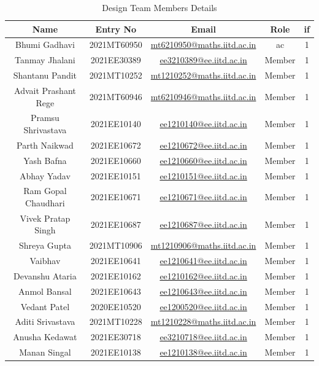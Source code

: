 \documentclass[12pt]{article} %
\begin{document}
\begin{table}[h!]
\centering
\begin{tabular}{|c|c|c|c|c|}
\hline
Name & Entry No & Email & Role & \acrshort{if} \\
\hline
Bhumi Gadhavi & 2021MT60950 & \href{mailto:mt6210950@maths.iitd.ac.in}{mt6210950@maths.iitd.ac.in} & \acrshort{ac} & 1 \\
Tanmay Jhalani & 2021EE30389 & \href{mailto:ee3210389@ee.iitd.ac.in}{ee3210389@ee.iitd.ac.in} & Member & 1 \\
Shantanu Pandit & 2021MT10252 & \href{mailto:mt1210252@maths.iitd.ac.in}{mt1210252@maths.iitd.ac.in} & Member & 1 \\
Advait Prashant Rege & 2021MT60946 & \href{mailto:mt6210946@maths.iitd.ac.in}{mt6210946@maths.iitd.ac.in} & Member & 1 \\
Pramsu Shrivastava & 2021EE10140 & \href{mailto:ee1210140@ee.iitd.ac.in}{ee1210140@ee.iitd.ac.in} & Member & 1 \\
Parth Naikwad & 2021EE10672 & \href{mailto:ee1210672@ee.iitd.ac.in}{ee1210672@ee.iitd.ac.in} & Member & 1 \\
Yash Bafna & 2021EE10660 & \href{mailto:ee1210660@ee.iitd.ac.in}{ee1210660@ee.iitd.ac.in} & Member & 1 \\
Abhay Yadav & 2021EE10151 & \href{mailto:ee1210151@ee.iitd.ac.in}{ee1210151@ee.iitd.ac.in} & Member & 1 \\
Ram Gopal Chaudhari & 2021EE10671 & \href{mailto:ee1210671@ee.iitd.ac.in}{ee1210671@ee.iitd.ac.in} & Member & 1 \\
Vivek Pratap Singh & 2021EE10687 & \href{mailto:ee1210687@ee.iitd.ac.in}{ee1210687@ee.iitd.ac.in} & Member & 1 \\
Shreya Gupta & 2021MT10906 & \href{mailto:mt1210906@maths.iitd.ac.in}{mt1210906@maths.iitd.ac.in} & Member & 1 \\
Vaibhav & 2021EE10641 & \href{mailto:ee1210641@ee.iitd.ac.in}{ee1210641@ee.iitd.ac.in} & Member & 1 \\
Devanshu Ataria & 2021EE10162 & \href{mailto:ee1210162@ee.iitd.ac.in}{ee1210162@ee.iitd.ac.in} & Member & 1 \\
Anmol Bansal & 2021EE10643 & \href{mailto:ee1210643@ee.iitd.ac.in}{ee1210643@ee.iitd.ac.in} & Member & 1 \\
Vedant Patel & 2020EE10520 & \href{mailto:ee1200520@ee.iitd.ac.in}{ee1200520@ee.iitd.ac.in} & Member & 1 \\
Aditi Srivastava & 2021MT10228 & \href{mailto:mt1210228@maths.iitd.ac.in}{mt1210228@maths.iitd.ac.in} & Member & 1 \\
Anusha Kedawat & 2021EE30718 & \href{mailto:ee3210718@ee.iitd.ac.in}{ee3210718@ee.iitd.ac.in} & Member & 1 \\
Manan Singal & 2021EE10138 & \href{mailto:ee1210138@ee.iitd.ac.in}{ee1210138@ee.iitd.ac.in} & Member & 1 \\
\hline
\end{tabular}
\caption{Design Team Members Details}
\label{tab:teamDetails}
\end{table}
\end{document}
